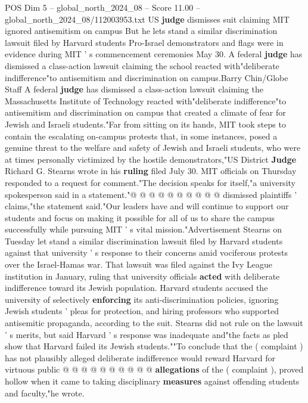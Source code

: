 \begin{textsample}{POS Dim 5 – global\_north\_2024\_08 – Score 11.00 – global\_north\_2024\_08/112003953.txt}  \label{ex:f5_pos_394}
US \textbf{judge} dismisses suit claiming MIT ignored antisemitism on campus But he lets stand a similar discrimination lawsuit filed by Harvard students Pro-Israel demonstrators and flags were in evidence during MIT ' s commencement ceremonies May 30.
A federal \textbf{judge} has dismissed a class-action lawsuit claiming the school reacted with"deliberate indifference"to antisemitism and discrimination on campus.Barry Chin/Globe Staff A federal \textbf{judge} has dismissed a class-action lawsuit claiming the Massachusetts Institute of Technology reacted with"deliberate indifference"to antisemitism and discrimination on campus that created a climate of fear for Jewish and Israeli students."Far from sitting on its hands, MIT took steps to contain the escalating on-campus protests that, in some instances, posed a genuine threat to the welfare and safety of Jewish and Israeli students, who were at times personally victimized by the hostile demonstrators,"US District \textbf{Judge} Richard G.
Stearns wrote in his \textbf{ruling} filed July 30.
MIT officials on Thursday responded to a request for comment."The decision speaks for itself,"a university spokesperson said in a statement."@ @ @ @ @ @ @ @ @ @ dismissed plaintiffs ' claims,"the statement said."Our leaders have and will continue to support our students and focus on making it possible for all of us to share the campus successfully while pursuing MIT ' s vital mission."Advertisement Stearns on Tuesday let stand a similar discrimination lawsuit filed by Harvard students against that university ' s response to their concerns amid vociferous protests over the Israel-Hamas war.
That lawsuit was filed against the Ivy League institution in January, ruling that university officials \textbf{acted} with deliberate indifference toward its Jewish population.
Harvard students accused the university of selectively \textbf{enforcing} its anti-discrimination policies, ignoring Jewish students ' pleas for protection, and hiring professors who supported antisemitic propaganda, according to the suit.
Stearns did not rule on the lawsuit ' s merits, but said Harvard ' s response was inadequate and"the facts as pled show that Harvard failed its Jewish students.""To conclude that the ( complaint ) has not plausibly alleged deliberate indifference would reward Harvard for virtuous public @ @ @ @ @ @ @ @ @ @ \textbf{allegations} of the ( complaint ), proved hollow when it came to taking disciplinary \textbf{measures} against offending students and faculty,"he wrote.

\end{textsample}
